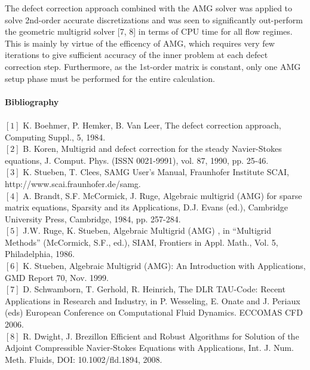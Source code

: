 \documentclass{report}
\begin{document}
The defect correction approach combined with the AMG solver was applied
to solve 2nd-order accurate
discretizations and was seen to significantly out-perform the geometric
multigrid solver [7, 8]
in terms of CPU time for all flow regimes. This is mainly by virtue of
the efficency of AMG, which requires
very few iterations to give sufficient accuracy of the inner problem at
each defect correction step.
Furthermore, as the 1st-order matrix is constant, only one AMG setup
phase must be performed for
the entire calculation.
~\\~\\{\Large \bf Bibliography} \\~\\
$[1]$ K. Boehmer, P. Hemker, B. Van Leer, The defect correction approach,
Computing Suppl., 5,
1984. \\[0.8ex]
$[2]$ B. Koren, Multigrid and defect correction for the steady
Navier-Stokes equations, J. Comput.
Phys. (ISSN 0021-9991), vol. 87, 1990, pp. 25-46. \\[0.8ex]
$[3]$ K. Stueben, T. Clees, SAMG User’s Manual, Fraunhofer Institute SCAI, \\
http://www.scai.fraunhofer.de/samg. \\[0.8ex]
$[4]$ A. Brandt, S.F. McCormick, J. Ruge, Algebraic multigrid (AMG) for
sparse matrix equations,
Sparsity and its Applications, D.J. Evans (ed.), Cambridge University
Press, Cambridge, 1984,
pp. 257-284. \\[0.8ex]
$[5]$ J.W. Ruge, K. Stueben, Algebraic Multigrid (AMG) , in “Multigrid
Methods” (McCormick,
S.F., ed.), SIAM, Frontiers in Appl. Math., Vol. 5, Philadelphia, 1986. \\[0.8ex]
$[6]$ K. Stueben, Algebraic Multigrid (AMG): An Introduction with
Applications, GMD Report 70,
Nov. 1999. \\[0.8ex]
$[7]$ D. Schwamborn, T. Gerhold, R. Heinrich, The DLR TAU-Code: Recent Applications in
Research and Industry, in P. Wesseling, E. Onate and J. Periaux (eds) European Conference
on Computational Fluid Dynamics. ECCOMAS CFD 2006. \\[0.8ex]
$[8]$ R. Dwight, J. Brezillon Efficient and Robust Algorithms for Solution of the Adjoint
Compressible Navier-Stokes Equations with Applications, Int. J. Num. Meth. Fluids, DOI:
10.1002/fld.1894, 2008.
\end{document}
